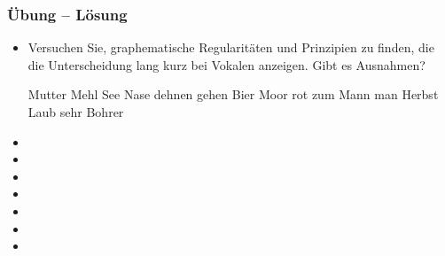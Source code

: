 
\begin{frame}
\frametitle{Übung -- Lösung}

\begin{itemize}	
	\item Versuchen Sie, graphematische Regularitäten und Prinzipien zu finden, die die Unterscheidung lang \vs kurz bei Vokalen anzeigen. Gibt es Ausnahmen?\\
	
	
	\begin{exe}
		\begin{xlist}
			\begin{multicols}{4}
				\ex Mutter
				\ex Mehl
				\ex See
				\ex Nase
				\ex dehnen
				\ex gehen
				\ex Bier
				\ex Moor
				\ex rot
				\ex zum
				\ex Mann
				\ex man
				\ex Herbst
				\ex Laub
				\ex sehr
				\ex Bohrer
			\end{multicols}
		\end{xlist}
	\end{exe}
	
\end{itemize}



\begin{multicols}{2}
\begin{itemize}
\item[\alertgreen{--}] 
\item[\alertgreen{--}] 
\item[\alertgreen{--}] 
\item[\alertgreen{--}] 
\item[\alertgreen{--}] 
\item[\alertgreen{--}] 
\item[\alertgreen{--}] 
\end{itemize}
\end{multicols}

\end{frame}

